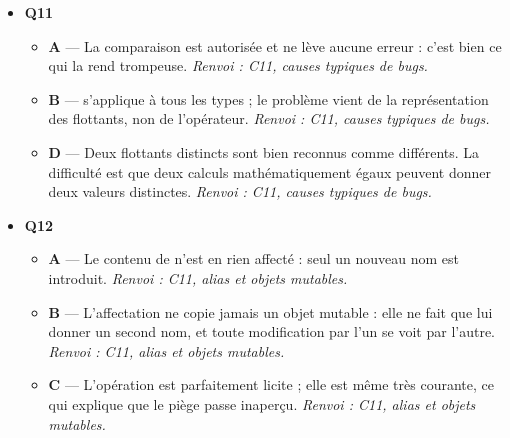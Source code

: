 \begin{itemize}
\begin{itemize}
    \item \textbf{C} — Introduire une classe par élément alourdit considérablement le programme sans rien apporter à une simple transformation. \emph{Renvoi : C10, choisir un paradigme adapté.}
    \item \textbf{D} — L'opération est au contraire courante ; c'est même l'exemple type du style fonctionnel. \emph{Renvoi : C10, choisir un paradigme adapté.}
  \end{itemize}
  \item \textbf{Q11}
  \begin{itemize}
    \item \textbf{A} — La comparaison est autorisée et ne lève aucune erreur : c'est bien ce qui la rend trompeuse. \emph{Renvoi : C11, causes typiques de bugs.}
    \item \textbf{B} — \code{==} s'applique à tous les types ; le problème vient de la représentation des flottants, non de l'opérateur. \emph{Renvoi : C11, causes typiques de bugs.}
    \item \textbf{D} — Deux flottants distincts sont bien reconnus comme différents. La difficulté est que deux calculs mathématiquement égaux peuvent donner deux valeurs distinctes. \emph{Renvoi : C11, causes typiques de bugs.}
  \end{itemize}
  \item \textbf{Q12}
  \begin{itemize}
    \item \textbf{A} — Le contenu de  n'est en rien affecté : seul un nouveau nom est introduit. \emph{Renvoi : C11, alias et objets mutables.}
    \item \textbf{B} — L'affectation ne copie jamais un objet mutable : elle ne fait que lui donner un second nom, et toute modification par l'un se voit par l'autre. \emph{Renvoi : C11, alias et objets mutables.}
    \item \textbf{C} — L'opération est parfaitement licite ; elle est même très courante, ce qui explique que le piège passe inaperçu. \emph{Renvoi : C11, alias et objets mutables.}
  \end{itemize}
\end{itemize}
\fi
